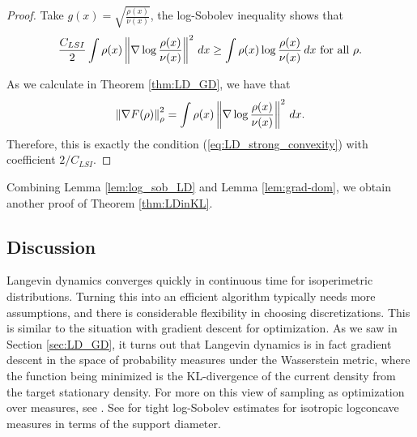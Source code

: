 \begin{proof}
Take $g(x)=\sqrt{\frac{\rho(x)}{\nu(x)}}$, the log-Sobolev inequality
shows that 
\[
\frac{C_{LSI}}{2}\int\rho(x)\left\Vert \nabla\log\frac{\rho(x)}{\nu(x)}\right\Vert^{2}\,dx\geq\int\rho(x)\log\frac{\rho(x)}{\nu(x)}\,dx\text{ for all }\rho.
\]

As we calculate in Theorem \ref{thm:LD_GD}, we have that
\[
\left\Vert \nabla F(\rho)\right\Vert^{2}_{\rho}=\int\rho(x)\left\Vert \nabla\log\frac{\rho(x)}{\nu(x)}\right\Vert^{2}\,dx.
\]
Therefore, this is exactly the condition (\ref{eq:LD_strong_convexity})
with coefficient $2/C_{LSI}$.
\end{proof}
Combining Lemma \ref{lem:log_sob_LD} and Lemma \ref{lem:grad-dom},
we obtain another proof of Theorem \ref{thm:LDinKL}.

\subsection{Discussion}

Langevin dynamics converges quickly in continuous time for isoperimetric
distributions. Turning this into an efficient algorithm typically
needs more assumptions, and there is considerable flexibility in choosing
discretizations. This is similar to the situation with gradient descent
for optimization. As we saw in Section \ref{sec:LD_GD}, it turns
out that Langevin dynamics is in fact gradient descent in the space
of probability measures under the Wasserstein metric, where the function
being minimized is the KL-divergence of the current density from the
target stationary density. For more on this view of sampling as optimization
over measures, see \cite{wibisono2018sampling}. See \cite{lee2024eldan}
for tight log-Sobolev estimates for isotropic logconcave measures
in terms of the support diameter.
